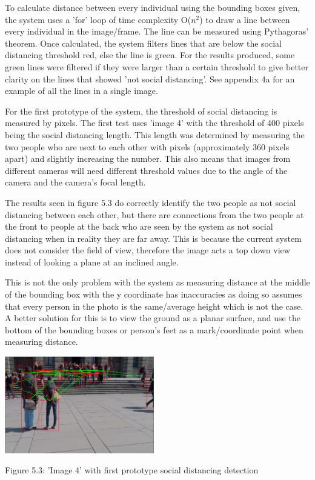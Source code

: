 \documentclass[12pt]{report}
\begin{document}
To calculate distance between every individual using the bounding boxes given, the system uses a 'for' loop of time complexity O($n^2$) to draw a line between every individual in the image/frame. The line can be measured using Pythagoras' theorem. Once calculated, the system filters lines that are below the social distancing threshold red, else the line is green. For the results produced, some green lines were filtered if they were larger than a certain threshold to give better clarity on the lines that showed 'not social distancing'. See appendix 4a for an example of all the lines in a single image.

\vspace{2mm}

For the first prototype of the system, the threshold of social distancing is measured by pixels. The first test uses 'image 4' with the threshold of 400 pixels being the social distancing length. This length was determined by measuring the two people who are next to each other with pixels (approximately 360 pixels apart) and slightly increasing the number. This also means that images from different cameras will need different threshold values due to the angle of the camera and the camera's focal length.

\vspace{2mm}

The results seen in figure 5.3 do correctly identify the two people as not social distancing between each other, but there are connections from the two people at the front to people at the back who are seen by the system as not social distancing when in reality they are far away. This is because the current system does not consider the field of view, therefore the image acts a top down view instead of looking a plane at an inclined angle.

\vspace{2mm}

This is not the only problem with the system as measuring distance at the middle of the bounding box with the y coordinate has inaccuracies as doing so assumes that every person in the photo is the same/average height which is not the case. A better solution for this is to view the ground as a planar surface, and use the bottom of the bounding boxes or person's feet as a mark/coordinate point when measuring distance. 

\begin{center}
	\includegraphics[width=65mm]{./images/appendix/test1.JPG}
	
	{\footnotesize Figure 5.3: 'Image 4' with first prototype social distancing detection}
\end{center}
\end{document}
